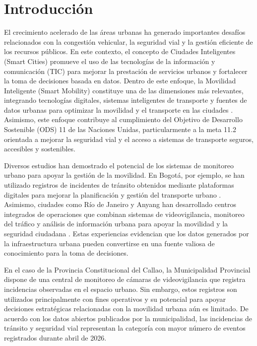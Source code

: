 \documentclass[]{IEEEphot}
\begin{document}
\section{Introducción}

El crecimiento acelerado de las áreas urbanas ha generado importantes desafíos relacionados con la congestión vehicular, la seguridad vial y la gestión eficiente de los recursos públicos. En este contexto, el concepto de Ciudades Inteligentes (Smart Cities) promueve el uso de las tecnologías de la información y comunicación (TIC) para mejorar la prestación de servicios urbanos y fortalecer la toma de decisiones basada en datos. Dentro de este enfoque, la Movilidad Inteligente (Smart Mobility) constituye una de las dimensiones más relevantes, integrando tecnologías digitales, sistemas inteligentes de transporte y fuentes de datos urbanas para optimizar la movilidad y el transporte en las ciudades \cite{schreiner2016international,maldonado2020smart}. Asimismo, este enfoque contribuye al cumplimiento del Objetivo de Desarrollo Sostenible (ODS) 11 de las Naciones Unidas, particularmente a la meta 11.2 orientada a mejorar la seguridad vial y el acceso a sistemas de transporte seguros, accesibles y sostenibles.

Diversos estudios han demostrado el potencial de los sistemas de monitoreo urbano para apoyar la gestión de la movilidad. En Bogotá, por ejemplo, se han utilizado registros de incidentes de tránsito obtenidos mediante plataformas digitales para mejorar la planificación y gestión del transporte urbano \cite{pedraza2025smart}. Asimismo, ciudades como Río de Janeiro y Anyang han desarrollado centros integrados de operaciones que combinan sistemas de videovigilancia, monitoreo del tráfico y análisis de información urbana para apoyar la movilidad y la seguridad ciudadana \cite{lee2016international,schreiner2016international}. Estas experiencias evidencian que los datos generados por la infraestructura urbana pueden convertirse en una fuente valiosa de conocimiento para la toma de decisiones.

En el caso de la Provincia Constitucional del Callao, la Municipalidad Provincial dispone de una central de monitoreo de cámaras de videovigilancia que registra incidencias observadas en el espacio urbano. Sin embargo, estos registros son utilizados principalmente con fines operativos y su potencial para apoyar decisiones estratégicas relacionadas con la movilidad urbana aún es limitado. De acuerdo con los datos abiertos publicados por la municipalidad, las incidencias de tránsito y seguridad vial representan la categoría con mayor número de eventos registrados durante abril de 2026.
\end{document}
